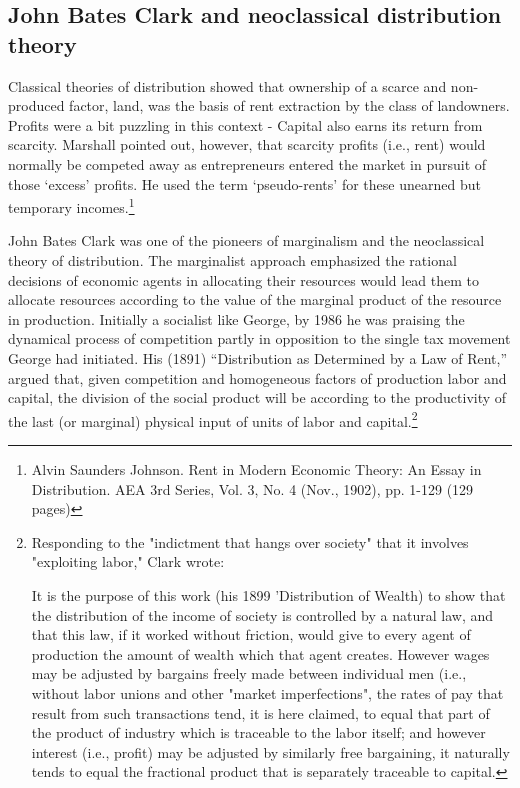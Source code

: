 


  \subsection{John Bates Clark and neoclassical distribution theory}
  Classical theories of distribution showed that ownership of a scarce and non-produced factor, land, was the  basis of rent extraction by the class of landowners. Profits were a bit puzzling in this context - Capital also earns its return from scarcity. Marshall pointed out, however, that scarcity profits (i.e., rent) would normally be competed away  as entrepreneurs entered the market in pursuit of those `excess' profits. He used the term `pseudo-rents' for these unearned but temporary incomes.\footnote{Alvin Saunders Johnson. Rent in Modern Economic Theory: An Essay in Distribution. AEA 3rd Series, Vol. 3, No. 4 (Nov., 1902), pp. 1-129 (129 pages)}

  
 John Bates Clark was one of the pioneers of marginalism and the neoclassical theory of  distribution.  The marginalist approach emphasized the rational decisions of economic agents in allocating their resources would lead them to allocate resources according to the value of the marginal product of the resource in production.  Initially a socialist like George, by 1986 he was praising the dynamical process of competition partly in opposition to the single tax movement George had initiated.  His (1891) ``Distribution as Determined by a Law of Rent,'' argued that, given  competition and homogeneous factors of production labor and capital, the division of the social product will be according to the productivity of the last (or marginal) physical input of units of labor and capital.\footnote{Responding to the "indictment that hangs over society" that it involves "exploiting labor," Clark wrote:

    It is the purpose of this work (his 1899 'Distribution of Wealth) to show that the distribution of the income of society is controlled by a natural law, and that this law, if it worked without friction, would give to every agent of production the amount of wealth which that agent creates. However wages may be adjusted by bargains freely made between individual men (i.e., without labor unions and other "market imperfections", the rates of pay that result from such transactions tend, it is here claimed, to equal that part of the product of industry which is traceable to the labor itself; and however interest (i.e., profit) may be adjusted by similarly free bargaining, it naturally tends to equal the fractional product that is separately traceable to capital.} 
 
